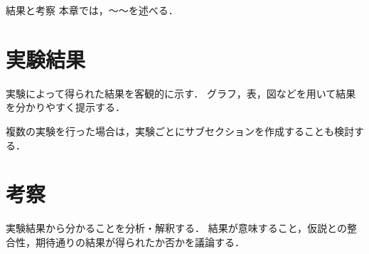 \chapterhead
{結果と考察}
{本章では，〜〜を述べる．}


\section{実験結果}
実験によって得られた結果を客観的に示す．
グラフ，表，図などを用いて結果を分かりやすく提示する．

複数の実験を行った場合は，実験ごとにサブセクションを作成することも検討する．

\newpage

\section{考察}
実験結果から分かることを分析・解釈する．
結果が意味すること，仮説との整合性，期待通りの結果が得られたか否かを議論する．

\newpage
